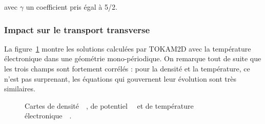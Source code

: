 \begin{refsection}

avec $\gamma$ un coefficient pris égal à 5/2. 
\subsubsection{Impact sur le transport transverse}

La figure~\ref{2-CartesWithTe} montre les solutions calculées par TOKAM2D avec
la température électronique dans une géométrie mono-périodique. On remarque tout
de suite que les trois champs sont fortement corrélés : pour la densité et
la température, ce n'est pas surprenant, les équations qui gouvernent leur
évolution sont très similaires. 
\begin{figure}[!htbp]
    \centering
    \caption{Cartes de densité~~, de
    potentiel~~ et de température 
    électronique~~.}
    \label{2-CartesWithTe}
	\end{figure}
	

\end{refsection}

